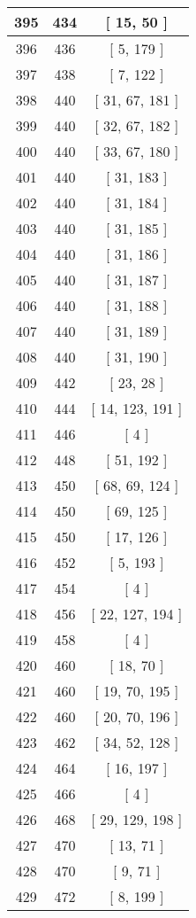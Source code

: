 \begin{center}
\begin{longtable}[H]{|| c c c ||}
\hline
395 & 434 & [ 15, 50 ] \\ 
\hline
396 & 436 & [ 5, 179 ] \\ 
\hline
397 & 438 & [ 7, 122 ] \\ 
\hline
398 & 440 & [ 31, 67, 181 ] \\ 
\hline
399 & 440 & [ 32, 67, 182 ] \\ 
\hline
400 & 440 & [ 33, 67, 180 ] \\ 
\hline
401 & 440 & [ 31, 183 ] \\ 
\hline
402 & 440 & [ 31, 184 ] \\ 
\hline
403 & 440 & [ 31, 185 ] \\ 
\hline
404 & 440 & [ 31, 186 ] \\ 
\hline
405 & 440 & [ 31, 187 ] \\ 
\hline
406 & 440 & [ 31, 188 ] \\ 
\hline
407 & 440 & [ 31, 189 ] \\ 
\hline
408 & 440 & [ 31, 190 ] \\ 
\hline
409 & 442 & [ 23, 28 ] \\ 
\hline
410 & 444 & [ 14, 123, 191 ] \\ 
\hline
411 & 446 & [ 4 ] \\ 
\hline
412 & 448 & [ 51, 192 ] \\ 
\hline
413 & 450 & [ 68, 69, 124 ] \\ 
\hline
414 & 450 & [ 69, 125 ] \\ 
\hline
415 & 450 & [ 17, 126 ] \\ 
\hline
416 & 452 & [ 5, 193 ] \\ 
\hline
417 & 454 & [ 4 ] \\ 
\hline
418 & 456 & [ 22, 127, 194 ] \\ 
\hline
419 & 458 & [ 4 ] \\ 
\hline
420 & 460 & [ 18, 70 ] \\ 
\hline
421 & 460 & [ 19, 70, 195 ] \\ 
\hline
422 & 460 & [ 20, 70, 196 ] \\ 
\hline
423 & 462 & [ 34, 52, 128 ] \\ 
\hline
424 & 464 & [ 16, 197 ] \\ 
\hline
425 & 466 & [ 4 ] \\ 
\hline
426 & 468 & [ 29, 129, 198 ] \\ 
\hline
427 & 470 & [ 13, 71 ] \\ 
\hline
428 & 470 & [ 9, 71 ] \\ 
\hline
429 & 472 & [ 8, 199 ] \\ 

\end{longtable}
\end{center}
